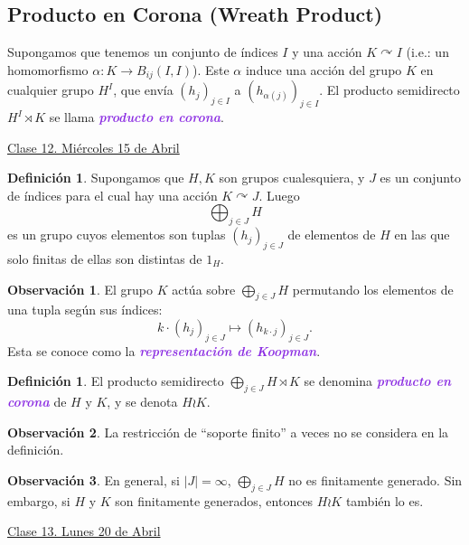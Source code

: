 \documentclass{article}
\theoremstyle{definition}
\newtheorem{definition}[theorem]{Definición}
\newtheorem*{obs}{Observación}
\theoremstyle{remark}
\numberwithin{equation}{section}
\renewcommand{\a}{\alpha}
\newcommand{\oo}{\infty}
\newcommand{\acts}{\curvearrowright}
\renewcommand{\c}{\cdot}
\newcommand{\abs}[1]{\left| #1 \right|}
\renewcommand{\o}{\to}
\newcommand{\ds}{\displaystyle}
\newcommand{\wea}[1]{\textcolor{BlueViolet}{\textbf{\emph{#1}}}}
\newcommand{\fecha}[1]{\begin{flushright} \underline{#1} \end{flushright}}
\begin{document}
\subsection{Producto en Corona (Wreath Product)}

Supongamos que tenemos un conjunto de índices $I$ y una acción $K \acts I$ (i.e.: un homomorfismo $\a \colon K \o B_{ij}(I,I)$). Este $\a$ induce una acción del grupo $K$ en cualquier grupo $H^I$, que envía $(h_j)_{j \in I}$ a $(h_{\a(j)})_{j \in I}$. El producto semidirecto $H^I \rtimes K$ se llama \wea{producto en corona}.

\fecha{Clase 12. Miércoles 15 de Abril}

\begin{definition}
  Supongamos que $H,K$ son grupos cualesquiera, y $J$ es un conjunto de índices para el cual hay una acción $K \acts J$. Luego $$\bigoplus _{j\in J} H$$ es un grupo cuyos elementos son tuplas $(h_j)_{j \in J}$ de elementos de $H$ en las que solo finitas de ellas son distintas de $1_H$.
\end{definition}

\begin{obs}
  El grupo $K$ actúa sobre $\bigoplus_{j \in J} H$ permutando los elementos de una tupla según sus índices:
  \[k \c (h_j)_{j \in J} \mapsto (h_{k \c j})_{j \in J}.\]
  Esta se conoce como la \wea{representación de Koopman}.
\end{obs}

\begin{definition}
  El producto semidirecto $\ds \bigoplus_{j \in J} H \rtimes K$ se denomina \wea{producto en corona} de $H$ y $K$, y se denota $H \wr K$.
\end{definition}

\begin{obs}
  La restricción de ``soporte finito'' a veces no se considera en la definición.
\end{obs}

\begin{obs}
  En general, si $\abs J = \oo$, $\ds \bigoplus_{j \in J} H$ no es finitamente generado.
  Sin embargo, si $H$ y $K$ son finitamente generados, entonces $H \wr K$ también lo es.
\end{obs}

\fecha{Clase 13. Lunes 20 de Abril}
\end{document}
